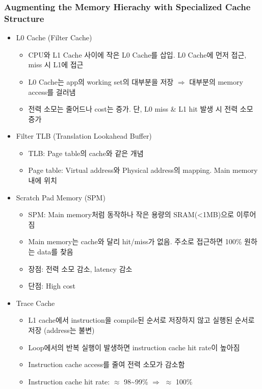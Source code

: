\subsubsection*{Augmenting the Memory Hierachy with Specialized Cache Structure}
\begin{itemize}
    \item L0 Cache (Filter Cache)
    \begin{itemize}
        \item CPU와 L1 Cache 사이에 작은 L0 Cache를 삽입. L0 Cache에 먼저 접근, miss 시 L1에 접근
        \item L0 Cache는 app의 working set의 대부분을 저장 $\Rightarrow$ 대부분의 memory access를 걸러냄
        \item 전력 소모는 줄어드나 cost는 증가. 단, L0 miss \& L1 hit 발생 시 전력 소모 증가
    \end{itemize}
    \item Filter TLB (Translation Lookahead Buffer)
    \begin{itemize}
        \item TLB: Page table의 cache와 같은 개념
        \item Page table: Virtual address와 Physical address의 mapping. Main memory 내에 위치
    \end{itemize}
    \item Scratch Pad Memory (SPM)
    \begin{itemize}
        \item SPM: Main memory처럼 동작하나 작은 용량의 SRAM({\textless}1MB)으로 이루어짐
        \item Main memory는 cache와 달리 hit/miss가 없음. 주소로 접근하면 100\% 원하는 data를 찾음
        \item 장점: 전력 소모 감소, latency 감소
        \item 단점: High cost
    \end{itemize}
    \item Trace Cache
    \begin{itemize}
        \item L1 cache에서 instruction을 compile된 순서로 저장하지 않고 실행된 순서로 저장 (address는 불변)
        \item Loop에서의 반복 실행이 발생하면 instruction cache hit rate이 높아짐
        \item Instruction cache access를 줄여 전력 소모가 감소함
        \item Instruction cache hit rate: $\approx$ 98\textasciitilde99\% $\Rightarrow$ $\approx$ 100\%

\end{itemize}
\end{itemize}
